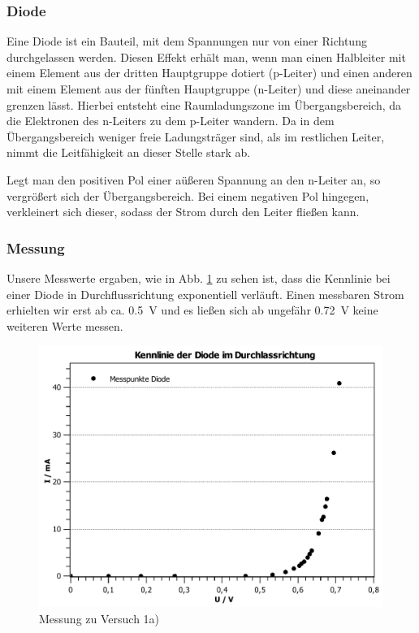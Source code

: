 \documentclass[11pt,a4paper,titlepage, ngerman]{article}
\begin{document}
			\subsubsection*{Diode}
				\label{Diode}
				
				Eine Diode ist ein Bauteil, mit dem Spannungen nur von einer Richtung durchgelassen werden. Diesen Effekt erhält man, wenn man einen Halbleiter mit einem Element aus der dritten Hauptgruppe dotiert (p-Leiter) und einen anderen mit einem Element aus der fünften Hauptgruppe (n-Leiter) und diese aneinander grenzen lässt. Hierbei entsteht eine Raumladungszone im Übergangsbereich, da die Elektronen des n-Leiters zu dem p-Leiter wandern. Da in dem Übergangsbereich weniger freie Ladungsträger sind, als im restlichen Leiter, nimmt die Leitfähigkeit an dieser Stelle stark ab.
				
				Legt man den positiven Pol einer aüßeren Spannung an den n-Leiter an, so vergrößert sich der Übergangsbereich. Bei einem negativen Pol hingegen, verkleinert sich dieser, sodass der Strom durch den Leiter fließen kann. 
			
			\subsubsection*{Messung}
				
				Unsere Messwerte ergaben, wie in Abb. \ref{KL a} zu sehen ist, dass die Kennlinie bei einer Diode in Durchflussrichtung exponentiell verläuft. Einen messbaren Strom erhielten wir erst ab ca. \SI{0.5}{\V} und es ließen sich ab ungefähr \SI{0.72}{\V} keine weiteren Werte messen. 
				
				\begin{figure}
					\centering
					\includegraphics[width=\textwidth]{KennlinieDiode.pdf}
					\caption{Messung zu Versuch 1a)}
					\label{KL a}
				\end{figure}
			
\end{document}
